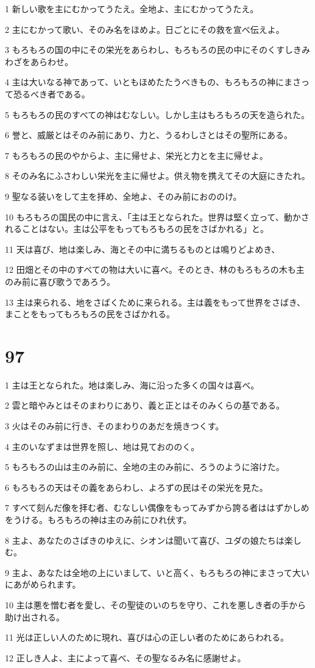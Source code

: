 \par 1 新しい歌を主にむかってうたえ。全地よ、主にむかってうたえ。
\par 2 主にむかって歌い、そのみ名をほめよ。日ごとにその救を宣べ伝えよ。
\par 3 もろもろの国の中にその栄光をあらわし、もろもろの民の中にそのくすしきみわざをあらわせ。
\par 4 主は大いなる神であって、いともほめたたうべきもの、もろもろの神にまさって恐るべき者である。
\par 5 もろもろの民のすべての神はむなしい。しかし主はもろもろの天を造られた。
\par 6 誉と、威厳とはそのみ前にあり、力と、うるわしさとはその聖所にある。
\par 7 もろもろの民のやからよ、主に帰せよ、栄光と力とを主に帰せよ。
\par 8 そのみ名にふさわしい栄光を主に帰せよ。供え物を携えてその大庭にきたれ。
\par 9 聖なる装いをして主を拝め、全地よ、そのみ前におののけ。
\par 10 もろもろの国民の中に言え、「主は王となられた。世界は堅く立って、動かされることはない。主は公平をもってもろもろの民をさばかれる」と。
\par 11 天は喜び、地は楽しみ、海とその中に満ちるものとは鳴りどよめき、
\par 12 田畑とその中のすべての物は大いに喜べ。そのとき、林のもろもろの木も主のみ前に喜び歌うであろう。
\par 13 主は来られる、地をさばくために来られる。主は義をもって世界をさばき、まことをもってもろもろの民をさばかれる。

\chapter{97}

\par 1 主は王となられた。地は楽しみ、海に沿った多くの国々は喜べ。
\par 2 雲と暗やみとはそのまわりにあり、義と正とはそのみくらの基である。
\par 3 火はそのみ前に行き、そのまわりのあだを焼きつくす。
\par 4 主のいなずまは世界を照し、地は見ておののく。
\par 5 もろもろの山は主のみ前に、全地の主のみ前に、ろうのように溶けた。
\par 6 もろもろの天はその義をあらわし、よろずの民はその栄光を見た。
\par 7 すべて刻んだ像を拝む者、むなしい偶像をもってみずから誇る者ははずかしめをうける。もろもろの神は主のみ前にひれ伏す。
\par 8 主よ、あなたのさばきのゆえに、シオンは聞いて喜び、ユダの娘たちは楽しむ。
\par 9 主よ、あなたは全地の上にいまして、いと高く、もろもろの神にまさって大いにあがめられます。
\par 10 主は悪を憎む者を愛し、その聖徒のいのちを守り、これを悪しき者の手から助け出される。
\par 11 光は正しい人のために現れ、喜びは心の正しい者のためにあらわれる。
\par 12 正しき人よ、主によって喜べ、その聖なるみ名に感謝せよ。

